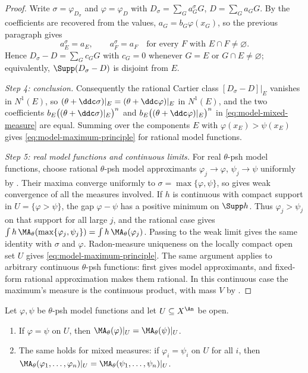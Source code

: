 \begin{proof}
Write $\sigma=\varphi_{D_\sigma}$ and $\varphi=\varphi_{D}$ with
$D_\sigma=\sum_Ga_G^\sigma G$, $D=\sum_Ga_GG$.  By
 the coefficients are recovered
from the values, $a_G=b_G\varphi(x_G)$, so the previous paragraph gives
\[
 a_E^\sigma=a_E,\qquad a_F^\sigma=a_F
 \quad\text{for every }F\text{ with }E\cap F\neq\varnothing .
\]
Hence $D_\sigma-D=\sum_Gc_GG$ with $c_G=0$ whenever $G=E$ or
$G\cap E\neq\varnothing$; equivalently, $\Supp(D_\sigma-D)$ is disjoint
from $E$.

\emph{Step 4: conclusion.}  Consequently the rational Cartier class
$[D_\sigma-D]|_E$ vanishes in $N^1(E)$, so
$(\theta+\ddc\sigma)|_E=(\theta+\ddc\varphi)|_E$ in $N^1(E)$, and the
two coefficients
$b_E\bigl((\theta+\ddc\sigma)|_E\bigr)^n$ and
$b_E\bigl((\theta+\ddc\varphi)|_E\bigr)^n$ in
\eqref{eq:model-mixed-measure} are equal.  Summing over the components $E$
with $\varphi(x_E)>\psi(x_E)$ gives
\eqref{eq:model-maximum-principle} for rational model functions.

\emph{Step 5: real model functions and continuous limits.}  For real
$\theta$-psh model functions, choose rational $\theta$-psh model
approximants $\varphi_j\to\varphi$, $\psi_j\to\psi$ uniformly by
.  Their maxima converge
uniformly to $\sigma=\max\{\varphi,\psi\}$, so
 gives weak convergence of all the
measures involved.  If $h$ is continuous with compact support in
$U=\{\varphi>\psi\}$, the gap $\varphi-\psi$ has a positive minimum
on $\Supp h$.  Thus $\varphi_j>\psi_j$ on that support for all large
$j$, and the rational case gives
$\int h\,\MA_\theta(\max\{\varphi_j,\psi_j\})
=\int h\,\MA_\theta(\varphi_j)$.
Passing to the weak limit gives the same identity with $\sigma$ and
$\varphi$.  Radon-measure uniqueness on the locally compact open set
$U$ gives \eqref{eq:model-maximum-principle}.
The same argument applies to arbitrary continuous $\theta$-psh functions:
 first gives model approximants,
and fixed-form rational approximation makes them rational.  In this
continuous case the maximum's measure is the continuous product, with mass
$V$ by .
\end{proof}

\begin{corollary}
\label{cor:ch24-model-locality-open}
Let $\varphi,\psi$ be $\theta$-psh model functions and let
$U\subseteq X^{\An}$ be open.
\begin{enumerate}
\item\label{itm:ch24-mlo:agree} If $\varphi=\psi$ on $U$, then
 $\MA_\theta(\varphi)|_U=\MA_\theta(\psi)|_U$.
\item\label{itm:ch24-mlo:mixed} The same holds for mixed measures: if
 $\varphi_i=\psi_i$ on $U$ for all $i$, then
 $\MA_\theta(\varphi_1,\ldots,\varphi_n)|_U
   =\MA_\theta(\psi_1,\ldots,\psi_n)|_U$.
\end{enumerate}
\end{corollary}

